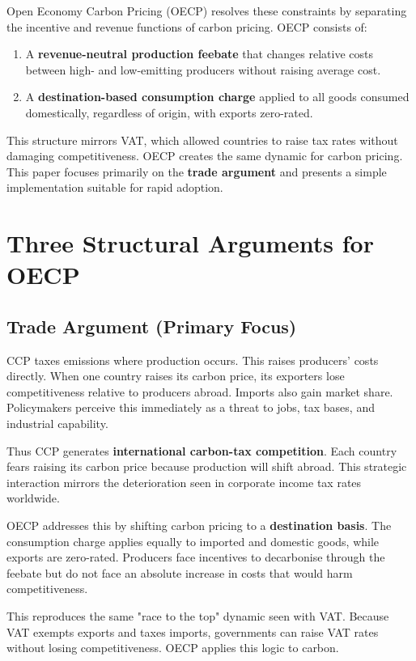 \documentclass[12pt]{article}
\begin{document}
Open Economy Carbon Pricing (OECP) resolves these constraints by separating the incentive and revenue functions of carbon pricing. OECP consists of:

\begin{enumerate}
    \item A \textbf{revenue-neutral production feebate} that changes relative costs between high- and low-emitting producers without raising average cost.
    \item A \textbf{destination-based consumption charge} applied to all goods consumed domestically, regardless of origin, with exports zero-rated.
\end{enumerate}

This structure mirrors VAT, which allowed countries to raise tax rates without damaging competitiveness. OECP creates the same dynamic for carbon pricing. This paper focuses primarily on the \textbf{trade argument} and presents a simple implementation suitable for rapid adoption.

\section{Three Structural Arguments for OECP}

\subsection{Trade Argument (Primary Focus)}
CCP taxes emissions where production occurs. This raises producers' costs directly. When one country raises its carbon price, its exporters lose competitiveness relative to producers abroad. Imports also gain market share. Policymakers perceive this immediately as a threat to jobs, tax bases, and industrial capability.

Thus CCP generates \textbf{international carbon-tax competition}. Each country fears raising its carbon price because production will shift abroad. This strategic interaction mirrors the deterioration seen in corporate income tax rates worldwide.

OECP addresses this by shifting carbon pricing to a \textbf{destination basis}. The consumption charge applies equally to imported and domestic goods, while exports are zero-rated. Producers face incentives to decarbonise through the feebate but do not face an absolute increase in costs that would harm competitiveness.

This reproduces the same "race to the top" dynamic seen with VAT. Because VAT exempts exports and taxes imports, governments can raise VAT rates without losing competitiveness. OECP applies this logic to carbon.
\end{document}
